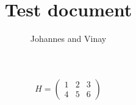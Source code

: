 \documentclass[a4paper,11pt]{article}
\author{Johannes and Vinay}
\title{Test document}
\begin{document}
\maketitle

\begin{equation}
H = \left(
\begin{array}{ccc}
  1 & 2 & 3   \\ 
  4 & 5& 6
\end{array}
\right)
\end{equation}

%
\end{document}
